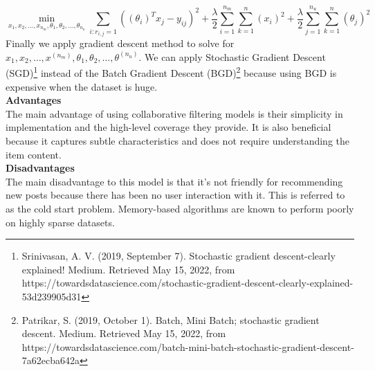 \begin{equation*}
\min_{x_{1},x_{2}, \dots,x_{n_{m}}, \theta_{1},\theta_{2}, \dots, \theta_{n_{u}} } 
\sum_{i:r_{i,j} = 1}\left((\theta_{i})^{T}x_{j}-y_{ij}\right)^{2} + 
\frac{\lambda}{2}
\sum_{i=1}^{n_{m}}
\sum_{k = 1}^{n}(x_{i})^{2}+
\frac{\lambda}{2}
\sum_{j=1}^{n_{u}}
\sum_{k = 1}^{n}(\theta_{j})^{2}
\end{equation*}
Finally we apply gradient descent method to solve for $x_{1},x_{2}, \dots,x^{(n_{m})}, \theta_{1},\theta_{2}, \dots, \theta^{(n_{u})}$. We can apply Stochastic Gradient Descent (SGD)\footnote{Srinivasan, A. V. (2019, September 7). Stochastic gradient descent-clearly explained! Medium. Retrieved May 15, 2022, from https://towardsdatascience.com/stochastic-gradient-descent-clearly-explained-53d239905d31 } instead of the Batch Gradient Descent (BGD)\footnote{Patrikar, S. (2019, October 1). Batch, Mini Batch; stochastic gradient descent. Medium. Retrieved May 15, 2022, from https://towardsdatascience.com/batch-mini-batch-stochastic-gradient-descent-7a62ecba642a} because using BGD is expensive when the dataset is huge. 
\\\textbf{Advantages}
\\The main advantage of using collaborative filtering models is their simplicity in implementation and the high-level coverage they provide. It is also beneficial because it captures subtle characteristics and does not require understanding the item content.
\\ \textbf{Disadvantages}
\\The main disadvantage to this model is that it's not friendly for recommending new posts because there has been no user interaction with it. This is referred to as the cold start problem. Memory-based algorithms are known to perform poorly on highly sparse datasets.


